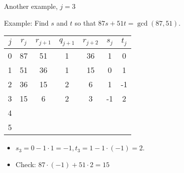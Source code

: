 \documentclass{beamer}
\begin{document}
\begin{frame}{Another example, $j=3$}

Example: Find $s$ and $t$ so that $87s+51t = \gcd(87, 51)$.

\vspace{1em}

\begin{tabular}{|c|c|c|c|c|c|c|}\hline
$j$   &  $r_{j}$    & $r_{j+1}$ & $q_{j+1}$ & $r_{j+2}$ & $s_j$ & $t_j$ \\ \hline\hline
0     &  87         &  51       &    1      &   36      &  1    &   0   \\ \hline
1     &  51         &  36       &    1      &   15      &  0    &   1   \\ \hline
2     &  36         &  15       &    2      &    6      &  1    &  -1   \\ \hline
3     &  15         &   6       &    2      &    3      & -1    &   2   \\ \hline
4     &             &           &           &           &       &       \\ \hline
5     &             &           &           &           &       &       \\ \hline
\end{tabular}

\vspace{1em}

\begin{itemize}
  \item $s_3 = 0 - 1\cdot 1 = -1, t_3 = 1 - 1\cdot (-1) = 2$.
  \item Check: $87\cdot (-1) + 51\cdot 2 = 15$
\end{itemize}

\end{frame}
\end{document}
